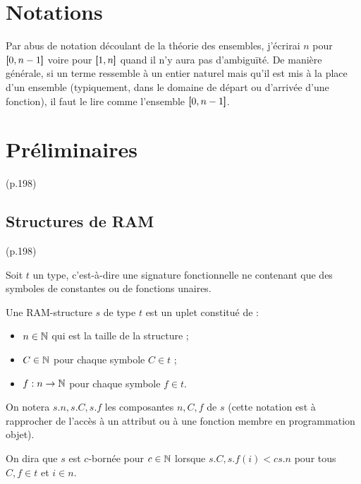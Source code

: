 	
	\section*{Notations}
		\label{sec:Notations}
	
	
	Par abus de notation découlant de la théorie des ensembles, j'écrirai $n$ pour $\left[\!\!\>\!\left[ 0 , n-1 \right]\!\!\>\!\right]$ voire pour $\left[\!\!\>\!\left[ 1 , n \right]\!\!\>\!\right]$ quand il n'y aura pas d'ambiguïté. De manière générale, si un terme ressemble à un entier naturel mais qu'il est mis à la place d'un ensemble (typiquement, dans le domaine de départ ou d'arrivée d'une fonction), il faut le lire comme l'ensemble $\left[\!\!\>\!\left[ 0 , n-1 \right]\!\!\>\!\right]$.
	
	\pagebreak
	
	\section{Préliminaires} (p.198)
		\label{sec:Preliminaries}
	
		\subsection{Structures de RAM} (p.198)
			\label{sec:RAM_data_structures}

		\begin{definition}
			\label{def:RAM_data_structures}
			Soit $t$ un type, c'est-à-dire une signature fonctionnelle ne contenant que des symboles de constantes ou de fonctions unaires.
			
			Une RAM-structure $s$ de type $t$ est un uplet constitué de :
			\begin{itemize}[itemsep=-1mm]
				\item 	$n \in \mathbb{N}$ qui est la taille de la structure ;
				\item 	$C \in \mathbb{N}$ pour chaque symbole $C \in t$ ;
				\item 	$f : n \to \mathbb{N}$ pour chaque symbole $f \in t$.
			\end{itemize}
			
			On notera $s.n, s.C, s.f$ les composantes $n, C, f$ de $s$ (cette notation est à rapprocher de l'accès à un attribut ou à une fonction membre en programmation objet).
			
			On dira que $s$ est $c$-bornée pour $c\in\mathbb{N}$ lorsque $s.C, s.f(i) < c s.n$ pour tous $C, f \in t$ et $i \in n$.
		\end{definition}
	
